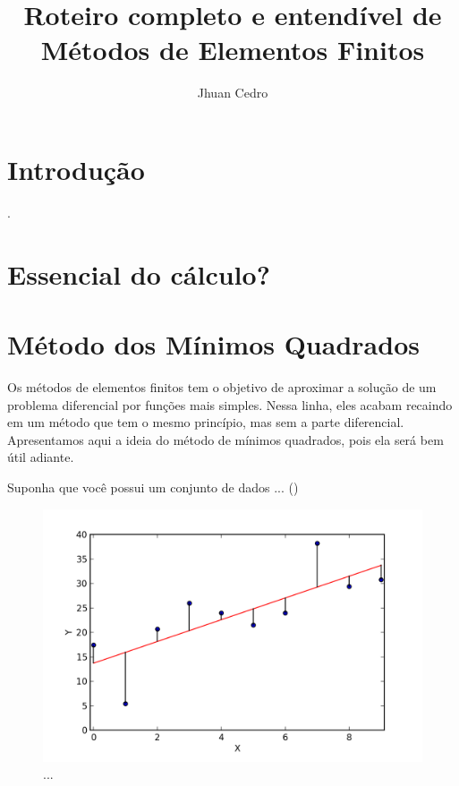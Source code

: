 \documentclass[12pt]{report}
\title{Roteiro completo e entendível de \\Métodos de Elementos Finitos}
\author{Jhuan Cedro}
\begin{document}
\maketitle
\tableofcontents
\newpage

	
\chapter{Introdução}	
\label{c:introducao}
.

\chapter{Essencial do cálculo?}

\chapter{Método dos Mínimos Quadrados}
	Os métodos de elementos finitos tem o objetivo de aproximar a solução de um problema diferencial por funções mais simples. Nessa linha, eles acabam recaindo em um método que tem o mesmo princípio, mas sem a parte diferencial. Apresentamos aqui a ideia do método de mínimos quadrados, pois ela será bem útil adiante.
	
	Suponha que você possui um conjunto de dados ...  ()
	\begin{figure}[h!]
		\centering
		\includegraphics[width=0.5\linewidth]{img/minimos-quadrados-erros.png}
		\caption{... 
		}
	\end{figure}
	
\end{document}
